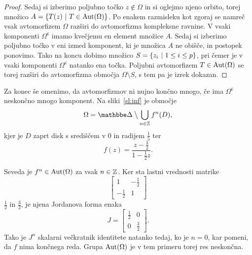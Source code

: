 \begin{proof}


Sedaj si izberimo poljubno točko $z \not \in \Omega$ in si oglejmo
njeno orbito, torej množico $A = \left\{T(z)~\middle\vert~T \in \operatorname{Aut}(\Omega)\right\}$.
Po enakem razmisleku kot zgoraj se namreč vsak avtomorfizem
$\Omega$ razširi do avtomorfizma kompleksne ravnine. V vsaki
komponenti $\Omega^\mathsf{c}$ imamo kvečjemu en element množice
$A$. Sedaj si izberimo poljubno točko v eni izmed komponent, ki je
množica $A$ ne obišče, in postopek ponovimo. Tako na koncu dobimo
množico $S = \left\{z_i~\middle\vert~1 \leq i \leq p\right\}$, pri čemer je v vsaki
komponenti $\Omega^\mathsf{c}$ natanko ena točka. Poljubni
avtomorfizem $T \in \operatorname{Aut}(\Omega)$ se torej razširi do avtomorfizma
območja $\Omega \setminus S$, s tem pa je izrek dokazan.
\end{proof}

Za konec še omenimo, da avtomorfizmov ni nujno končno mnogo, če
ima $\Omega^\mathsf{c}$ neskončno mnogo komponent. Na
sliki~\ref{sl:inf} je območje
\[
\Omega = \dsk \bigsetminus \bigcup_{n \in \Z} f^n(D),
\]
kjer je $D$ zaprt disk s središčem v $0$ in radijem $\frac{1}{5}$
ter
\[
f(z) = \frac{z - \frac{1}{2}}{1 - \frac{1}{2} z}.
\]



Seveda je $f^n \in \operatorname{Aut}(\Omega)$ za vsak $n \in \mathbb{Z}$. Ker sta lastni
vrednosti matrike
\[
\begin{bmatrix}
      1      & -\frac{1}{2} \\
-\frac{1}{2} &       1
\end{bmatrix}
\]
$\frac{1}{2}$ in $\frac{3}{2}$, je njena Jordanova forma enaka
\[
J =
\begin{bmatrix}
\frac{1}{2} &      0      \\
     0      & \frac{3}{2}
\end{bmatrix}.
\]
Tako je $J^n$ skalarni večkratnik identitete natanko tedaj, ko je
$n = 0$, kar pomeni, da $f$ nima končnega reda. Grupa
$\operatorname{Aut}(\Omega)$ je v tem primeru torej res neskončna.
